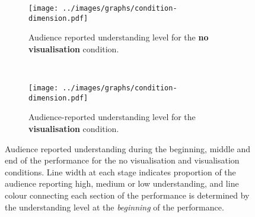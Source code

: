 \begin{figure}
\centering
\begin{subfigure}{\textwidth}
  \centering
  \texttt{[image: ../images/graphs/condition-dimension.pdf]}
  \caption[No visualisation condition understanding detailed survey results]{Audience reported understanding level for the \textbf{no visualisation} condition.}
  \label{fig:no-visualisation-understanding}
\end{subfigure}\\
\vspace{15mm}
\begin{subfigure}{\textwidth}
  \centering
  \texttt{[image: ../images/graphs/condition-dimension.pdf]}
  \caption[Visualisation condition understanding detailed survey results]{Audience-reported understanding level for the \textbf{visualisation} condition.}
  \label{fig:visualisation-understanding}
\end{subfigure}
\vspace{15mm}
\caption[Follow-up user study understanding survey responses]{Audience reported understanding during the beginning, middle and end of the performance for the no visualisation and visualisation conditions. Line width at each stage indicates proportion of the audience reporting high, medium or low understanding, and line colour connecting each section of the performance is determined by the understanding level at the \emph{beginning} of the performance.}
\label{fig:follow-up-user-study-condition-understanding}
\end{figure}